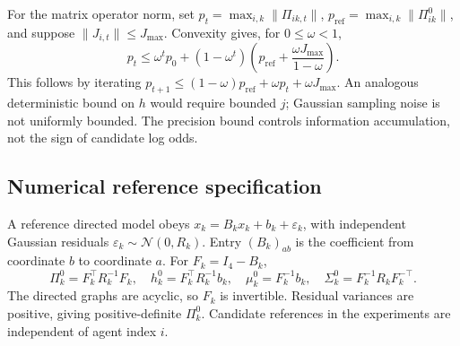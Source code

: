 \documentclass[runningheads]{llncs}
\newcommand{\Normal}{\mathcal N}
\begin{document}
For the matrix operator norm, set $p_t=\max_{i,k}\|\Pi_{ik,t}\|$,
$p_{\mathrm{ref}}=\max_{i,k}\|\Pi^0_{ik}\|$, and suppose
$\|J_{i,t}\|\leq J_{\max}$. Convexity gives, for $0\leq\omega<1$,
\begin{equation}
 p_t\leq\omega^t p_0+(1-\omega^t)
       \left(p_{\mathrm{ref}}+\frac{\omega J_{\max}}{1-\omega}\right).
 \label{eq:precision-bound}
\end{equation}
This follows by iterating
$p_{t+1}\leq(1-\omega)p_{\mathrm{ref}}+\omega p_t+\omega J_{\max}$.
An analogous deterministic bound on $h$ would require bounded $j$; Gaussian
sampling noise is not uniformly bounded. The precision bound controls information
accumulation, not the sign of candidate log odds.

\subsection{Numerical reference specification}
\label{app:parameters}
A reference directed model obeys $x_k=B_kx_k+b_k+\varepsilon_k$, with independent
Gaussian residuals $\varepsilon_k\sim\Normal(0,R_k)$. Entry $(B_k)_{ab}$ is the
coefficient from coordinate $b$ to coordinate $a$. For $F_k=I_4-B_k$,
\begin{equation}
 \Pi^0_k=F_k^\top R_k^{-1}F_k,\quad h^0_k=F_k^\top R_k^{-1}b_k,\quad
 \mu^0_k=F_k^{-1}b_k,\quad \Sigma^0_k=F_k^{-1}R_kF_k^{-\top}.
 \label{eq:compile}
\end{equation}
The directed graphs are acyclic, so $F_k$ is invertible. Residual variances are
positive, giving positive-definite $\Pi^0_k$. Candidate references in the
experiments are independent of agent index $i$.
\end{document}
